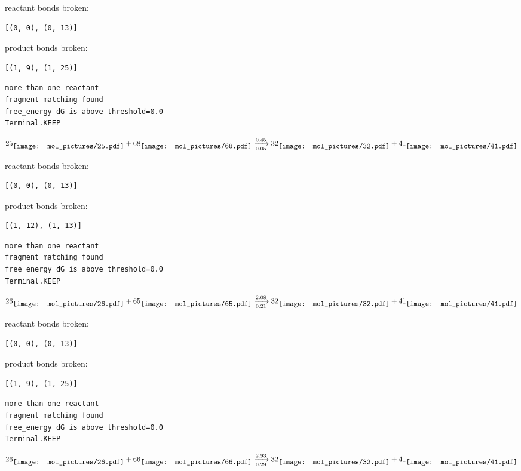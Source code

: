 \documentclass{article}
\begin{document}
reactant bonds broken:\begin{verbatim}
[(0, 0), (0, 13)]
\end{verbatim}
product bonds broken:\begin{verbatim}
[(1, 9), (1, 25)]
\end{verbatim}




\vspace{1cm}
\begin{verbatim}
more than one reactant
fragment matching found
free_energy dG is above threshold=0.0
Terminal.KEEP
\end{verbatim}
$$
25
\raisebox{-.5\height}{\texttt{[image: mol\_pictures/25.pdf]}}
+
68
\raisebox{-.5\height}{\texttt{[image: mol\_pictures/68.pdf]}}
\xrightarrow[0.05]{0.45}
32
\raisebox{-.5\height}{\texttt{[image: mol\_pictures/32.pdf]}}
+
41
\raisebox{-.5\height}{\texttt{[image: mol\_pictures/41.pdf]}}
$$


reactant bonds broken:\begin{verbatim}
[(0, 0), (0, 13)]
\end{verbatim}
product bonds broken:\begin{verbatim}
[(1, 12), (1, 13)]
\end{verbatim}




\vspace{1cm}
\begin{verbatim}
more than one reactant
fragment matching found
free_energy dG is above threshold=0.0
Terminal.KEEP
\end{verbatim}
$$
26
\raisebox{-.5\height}{\texttt{[image: mol\_pictures/26.pdf]}}
+
65
\raisebox{-.5\height}{\texttt{[image: mol\_pictures/65.pdf]}}
\xrightarrow[0.21]{2.08}
32
\raisebox{-.5\height}{\texttt{[image: mol\_pictures/32.pdf]}}
+
41
\raisebox{-.5\height}{\texttt{[image: mol\_pictures/41.pdf]}}
$$


reactant bonds broken:\begin{verbatim}
[(0, 0), (0, 13)]
\end{verbatim}
product bonds broken:\begin{verbatim}
[(1, 9), (1, 25)]
\end{verbatim}




\vspace{1cm}
\begin{verbatim}
more than one reactant
fragment matching found
free_energy dG is above threshold=0.0
Terminal.KEEP
\end{verbatim}
$$
26
\raisebox{-.5\height}{\texttt{[image: mol\_pictures/26.pdf]}}
+
66
\raisebox{-.5\height}{\texttt{[image: mol\_pictures/66.pdf]}}
\xrightarrow[0.29]{2.93}
32
\raisebox{-.5\height}{\texttt{[image: mol\_pictures/32.pdf]}}
+
41
\raisebox{-.5\height}{\texttt{[image: mol\_pictures/41.pdf]}}
$$
\end{document}

